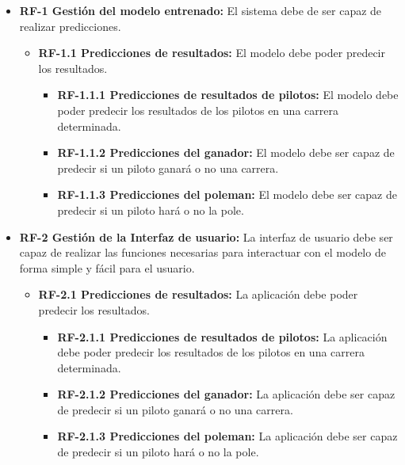 \begin{itemize}
    \item \textbf{RF-1 Gestión del modelo entrenado:} 
        El sistema debe de ser capaz de realizar predicciones.
        \begin{itemize}
            \item \textbf{RF-1.1 Predicciones de resultados:}
                El modelo debe poder predecir los resultados.
                \begin{itemize}
                    \item \textbf{RF-1.1.1 Predicciones de resultados de pilotos:}
                        El modelo debe poder predecir los resultados de los pilotos en una carrera determinada.
                    \item \textbf{RF-1.1.2 Predicciones del ganador:}
                        El modelo debe ser capaz de predecir si un piloto ganará o no una carrera.
                    \item \textbf{RF-1.1.3 Predicciones del poleman:}
                        El modelo debe ser capaz de predecir si un piloto hará o no la pole.
				\end{itemize}
        \end{itemize}
    \item \textbf{RF-2 Gestión de la Interfaz de usuario:}
        La interfaz de usuario debe ser capaz de realizar las funciones necesarias para interactuar con el modelo de forma simple y fácil para el usuario.
        \begin{itemize}
            \item \textbf{RF-2.1 Predicciones de resultados:}
                La aplicación debe poder predecir los resultados.
                \begin{itemize}
                    \item \textbf{RF-2.1.1 Predicciones de resultados de pilotos:}
                        La aplicación debe poder predecir los resultados de los pilotos en una carrera determinada.
                    \item \textbf{RF-2.1.2 Predicciones del ganador:}
                        La aplicación debe ser capaz de predecir si un piloto ganará o no una carrera.
                    \item \textbf{RF-2.1.3 Predicciones del poleman:}
                        La aplicación debe ser capaz de predecir si un piloto hará o no la pole.
				\end{itemize}
        \end{itemize}
\end{itemize}
    


